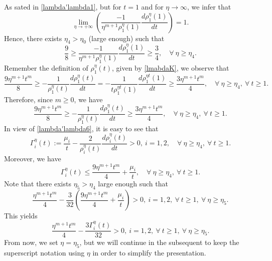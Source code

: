 \documentclass[12pt,leqno]{amsart}
\numberwithin{equation}{section}
\theoremstyle{remark}
\def\d{\displaystyle}
\begin{document}
As sated in \eqref{lambda'lambda1}, but for $t=1$ and for $\eta \to \infty$, we infer that
\begin{equation}\label{lambda'lambda2}
\d \lim_{\eta \to +\infty} \left(\frac{-1}{\eta^{m+1}\rho^{\eta}_1(1)}\frac{d\rho^{\eta}_1(1)}{dt}\right)=1.
\end{equation}
Hence, there exists $\eta_4>\eta_0$ (large enough) such that
\begin{equation}\label{lambda'lambda3}
\d \frac98 \ge \frac{-1}{\eta^{m+1}\rho^{\eta}_1(1)}\frac{d\rho^{\eta}_1(1)}{dt} \ge \frac34, \quad \forall \ \eta \ge \eta_4.
\end{equation}
Remember the definition of $\rho^{\eta}_1(t)$, given by \eqref{lmabdaK}, we observe that
\begin{equation}\label{lambda'lambda4}
\d \frac{9\eta^{m+1} t^{m}}8 \ge -\frac{1}{\rho^{\eta}_1(t)}\frac{d\rho^{\eta}_1(t)}{dt} = -\frac{1}{t \rho^{\eta t}_1(1)}\frac{d\rho^{\eta t}_1(1)}{dt} 
 \ge \frac{3\eta^{m+1} t^{m}}4, \quad \forall \ \eta \ge \eta_4, \ \forall \ t \ge 1.
\end{equation}
Therefore, since $m \ge 0$, we have
\begin{equation}\label{lambda'lambda6}
\frac{9 \eta^{m+1} t^{m}}8 \ge -\frac{1}{\rho^{\eta}_1(t)}\frac{d\rho^{\eta}_1(t)}{dt}
 \ge  \frac{3 \eta^{m+1} t^{m}}4, \quad \forall \ \eta \ge \eta_4, \ \forall \ t \ge 1.
\end{equation}
In view of \eqref{lambda'lambda6}, it is easy to see that  
\begin{equation}\label{Gamma-pos}
\d \Gamma_i^{\eta}(t):=\frac{\mu_i}{t}- \frac{2}{\rho^{\eta}_i(t)}\frac{d\rho^{\eta}_i(t)}{dt} > 0, \  i=1,2, \quad \forall \ \eta \ge \eta_4, \ \forall \ t \ge 1.
\end{equation}
Moreover, we have $$\Gamma_i^{\eta}(t) \le \frac{9 \eta^{m+1} t^{m}}4 +\frac{\mu_i}{t}, \quad \forall \ \eta \ge \eta_4, \ \forall \ t \ge 1.$$
Note that there exists $\eta_5 > \eta_4$ large enough such that  
$$\d \frac{\eta^{m+1}t^{m}}{4}-\frac{3}{32} \left( \frac{9 \eta^{m+1} t^{m}}4 +\frac{\mu_i}{t} \right)>0, \  i=1,2,   \ \forall  \ t \ge 1,   \ \forall  \  \eta \ge \eta_5.$$
This yields
\begin{equation}\label{Gamma-pos-diff}
\d \frac{\eta^{m+1}t^{m}}{4}-\frac{3  \Gamma_i^{\eta}(t)}{32}>0, \  i=1,2,   \ \forall  \ t \ge 1,   \ \forall  \  \eta \ge \eta_5.
\end{equation}
From  now, we set $\eta =  \eta_5$, but we will continue in the subsequent to keep the superscript notation using $\eta$ in order to simplify the presentation. 
\end{document}
